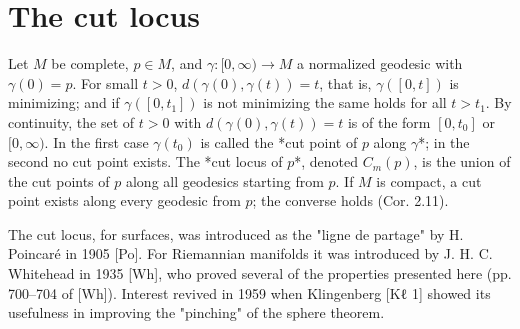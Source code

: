 \section{The cut locus}

Let $M$ be complete, $p\in M$, and $\gamma:[0,\infty)\to M$ a normalized geodesic
with $\gamma(0)=p$. For small $t>0$, $d(\gamma(0),\gamma(t))=t$, that is,
$\gamma([0,t])$ is minimizing; and if $\gamma([0,t_1])$ is not minimizing the same
holds for all $t>t_1$. By continuity, the set of $t>0$ with
$d(\gamma(0),\gamma(t))=t$ is of the form $[0,t_0]$ or $[0,\infty)$. In the first
case $\gamma(t_0)$ is called the *cut point of $p$ along $\gamma$*; in the second
no cut point exists. The *cut locus of $p$*, denoted $C_m(p)$, is the union of the
cut points of $p$ along all geodesics starting from $p$. If $M$ is compact, a cut
point exists along every geodesic from $p$; the converse holds (Cor. 2.11).

\begin{remark}[Remark 2.1]
  \label{rem:dc-ch13-2-1}
  The cut locus, for surfaces, was introduced as the "ligne de partage" by
  H. Poincaré in 1905 [Po]. For Riemannian manifolds it was introduced by
  J. H. C. Whitehead in 1935 [Wh], who proved several of the properties presented
  here (pp. 700–704 of [Wh]). Interest revived in 1959 when Klingenberg [Kℓ 1]
  showed its usefulness in improving the "pinching" of the sphere theorem.
\end{remark}

